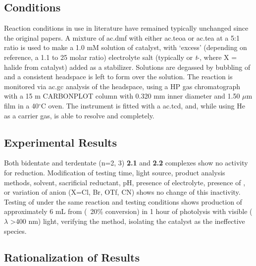 \subsection{Conditions}

Reaction conditions in use in literature have remained typically unchanged since the original papers. A mixture of \gls{ac.dmf} with either \gls{ac.teoa} or \gls{ac.tea} at a 5:1 ratio is used to make a 1.0 mM solution of catalyst, with `excess' (depending on reference, a 1.1 to 25 molar ratio) electrolyte salt (typically  or \textit{t}-, where X = halide from catalyst) added as a stabilizer. Solutions are degassed by bubbling of  and a consistent headspace is left to form over the solution. The reaction is monitored via \gls{ac.gc} analysis of the headspace, using a HP gas chromatograph with a 15 m CARBONPLOT column with 0.320 mm inner diameter and 1.50 $\mu$m film in a 40$^\circ$C oven. The instrument is fitted with a \gls{ac.tcd}, and, while using He as a carrier gas, is able to resolve  and  completely.  

\subsection{Experimental Results}

Both bidentate and terdentate  (n=2, 3) \textbf{2.1} and \textbf{2.2} complexes show no activity for  reduction. Modification of testing time, light source, product analysis methods, solvent, sacrificial reductant, pH, presence of electrolyte, presence of , or variation of anion (X=Cl, Br, OTf, CN) shows no change of this inactivity. Testing of  under the same reaction and testing conditions shows production of approximately 6 mL  from  (~20\% conversion) in 1 hour of photolysis with visible ($\lambda$ \textgreater 400 nm) light, verifying the method, isolating the catalyst as the ineffective species. 

\subsection{Rationalization of Results}\label{ss.rationalization}

